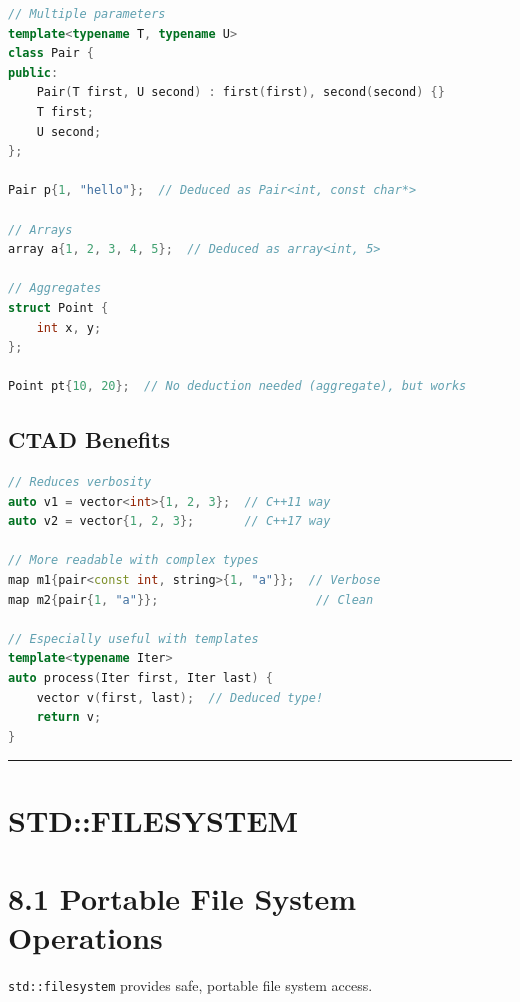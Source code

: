 \begin{lstlisting}[language={C++}]
// Multiple parameters
template<typename T, typename U>
class Pair {
public:
    Pair(T first, U second) : first(first), second(second) {}
    T first;
    U second;
};

Pair p{1, "hello"};  // Deduced as Pair<int, const char*>

// Arrays
array a{1, 2, 3, 4, 5};  // Deduced as array<int, 5>

// Aggregates
struct Point {
    int x, y;
};

Point pt{10, 20};  // No deduction needed (aggregate), but works
\end{lstlisting}

\hypertarget{ctad-benefits}{%
\subsection{CTAD Benefits}\label{ctad-benefits}}

\begin{lstlisting}[language={C++}]
// Reduces verbosity
auto v1 = vector<int>{1, 2, 3};  // C++11 way
auto v2 = vector{1, 2, 3};       // C++17 way

// More readable with complex types
map m1{pair<const int, string>{1, "a"}};  // Verbose
map m2{pair{1, "a"}};                      // Clean

// Especially useful with templates
template<typename Iter>
auto process(Iter first, Iter last) {
    vector v(first, last);  // Deduced type!
    return v;
}
\end{lstlisting}

\begin{center}\rule{0.5\linewidth}{0.5pt}\end{center}

\hypertarget{stdfilesystem}{%
\section{STD::FILESYSTEM}\label{stdfilesystem}}

\hypertarget{portable-file-system-operations}{%
\section{8.1 Portable File System
Operations}\label{portable-file-system-operations}}

\passthrough{\lstinline!std::filesystem!} provides safe, portable file
system access.

